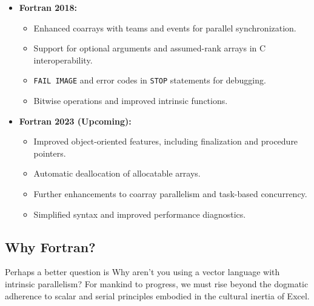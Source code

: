\begin{itemize}
    \item \textbf{Fortran 2018:}
    \begin{itemize}
        \item Enhanced coarrays with teams and events for parallel synchronization.
        \item Support for optional arguments and assumed-rank arrays in C interoperability.
        \item \texttt{FAIL IMAGE} and error codes in \texttt{STOP} statements for debugging.
        \item Bitwise operations and improved intrinsic functions.
    \end{itemize}

    \item \textbf{Fortran 2023 (Upcoming):}
    \begin{itemize}
        \item Improved object-oriented features, including finalization and procedure pointers.
        \item Automatic deallocation of allocatable arrays.
        \item Further enhancements to coarray parallelism and task-based concurrency.
        \item Simplified syntax and improved performance diagnostics.
    \end{itemize}
\end{itemize}

\subsection{Why Fortran?}
Perhaps a better question is Why aren't you using a vector language with intrinsic parallelism? For mankind to progress, we must rise beyond the dogmatic adherence to scalar and serial principles embodied in the cultural inertia of Excel.


\endinput  %